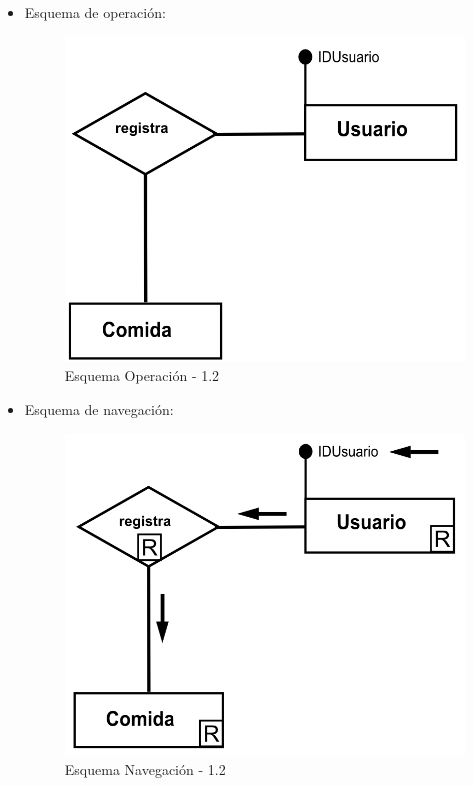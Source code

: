 \documentclass[a4paper,12pt]{report}
\begin{document}
\begin{enumerate}
\begin{itemize}
\item Esquema de operación:
\begin{figure}[!htp]
\centering
\includegraphics[width=0.9\linewidth]{./operaciones/img/Estadisticas/12_ope.png}
\caption{Esquema Operación - 1.2}
\label{fig:ope12}
\medskip
\footnotesize
{}
\end{figure}
\item Esquema de navegación:
\begin{figure}[!htp]
\centering
\includegraphics[width=0.9\linewidth]{./operaciones/img/Estadisticas/12_nav.png}
\caption{Esquema Navegación - 1.2}
\label{fig:nave12}
\medskip
\footnotesize
{}
\end{figure}
\end{itemize}


\end{enumerate}
\end{document}
